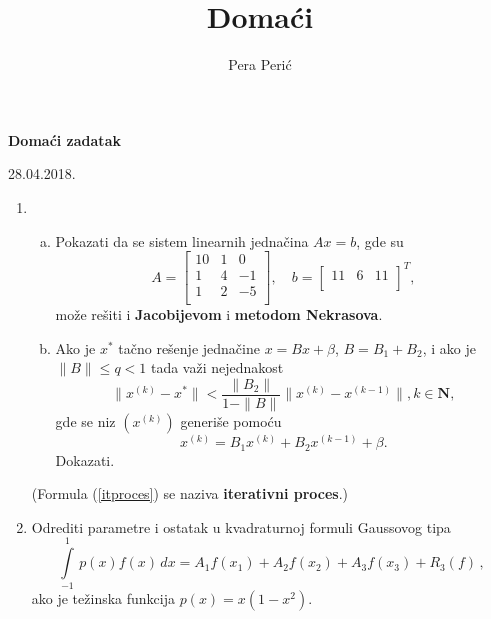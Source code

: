 \documentclass[a4, 11pt, leqno]{article}
\author{Pera Peri\'{c}}
\title{Doma\' ci}
\begin{document}
  \maketitle
  \thispagestyle{empty}
  \newpage

  \centerline{\bf Doma\' ci zadatak}
  \medskip
  \centerline{28.04.2018.}

  \vskip1cm

  \begin{enumerate}

    \item \begin{enumerate}[a)]
            \item Pokazati da se sistem linearnih jedna\v cina $Ax=b$, gde su
                $$A=\left[
                    \begin{array}{ccc}
                      10 & 1 & 0 \\
                      1 & 4 & -1 \\
                      1 & 2 & -5 \\
                    \end{array}
                \right] ,\quad
                  b=\left[
                    \begin{array}{ccc}
                      11 & 6 & 11 \\
                    \end{array} \right]^T,$$
              mo\v ze re\v siti i {\bf Jacobijevom} i {\bf metodom Nekrasova}.

            \item Ako je $x^{*}$ ta\v cno re\v senje jedna\v cine $x=Bx+\beta$, $B=B_1+B_2$, i ako je $\|B\|\leq q<1$ tada va\v zi nejednakost
                $$\|x^{(k)}-x^*\|< \frac{\|B_2\|}{1-\|B\|} \|x^{(k)}-x^{(k-1)}\|,k\in \mathbf{N},$$ %
                gde se niz $(x^{(k)})$ generi\v se pomo\' cu
                \begin{equation}
                \label{itproces}
                  x^{(k)}=B_1x^{(k)}+B_2x^{(k-1)}+\beta.
                \end{equation}
             Dokazati.
           \end{enumerate}

    (Formula (\ref{itproces}) se naziva {\bf iterativni proces}.)


    \item  Odrediti parametre i ostatak u kvadraturnoj formuli Gaussovog tipa
      $$\int\limits_{-1}^1\, p(x)f(x)\, dx=A_1f(x_1)+A_2f(x_2)+A_3f(x_3)+R_3(f)\, ,$$
      ako je te\v zinska funkcija $p(x)=x(1-x^2)$.\\


\end{enumerate}
\end{document}
